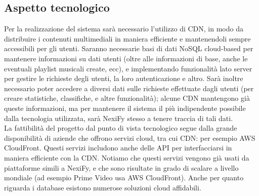 \subsection{Aspetto tecnologico}
Per la realizzazione del sistema sarà necessario l'utilizzo di CDN, in modo da distribuire i contenuti multimediali in maniera efficiente e mantenendoli sempre accessibili per gli utenti. Saranno necessarie basi di dati NoSQL cloud-based per mantenere informazioni su dati utenti (oltre alle informazioni di base, anche le eventuali playlist musicali create, ecc), e implementando funzionalità lato server per gestire le richieste degli utenti, la loro autenticazione e altro. Sarà inoltre necessario poter accedere a diversi dati sulle richieste effettuate dagli utenti (per creare statistiche, classifiche, e altre funzionalità); alcune CDN mantengono già queste informazioni, ma per mantenere il sistema il più indipendente possibile dalla tecnologia utilizzata, sarà NexiFy stesso a tenere traccia di tali dati. \\
La fattibilità del progetto dal punto di vista tecnologico segue dalla grande disponibilità di aziende che offrono servizi cloud, tra cui CDN: per esempio AWS CloudFront. Questi servizi includono anche delle API per interfacciarsi in maniera efficiente con la CDN. Notiamo che questi servizi vengono già usati da piattaforme simili a NexiFy, e che sono risultate in grado di scalare a livello mondiale (ad esempio Prime Video usa AWS CloudFront). Anche per quanto riguarda i database esistono numerose soluzioni cloud affidabili.





